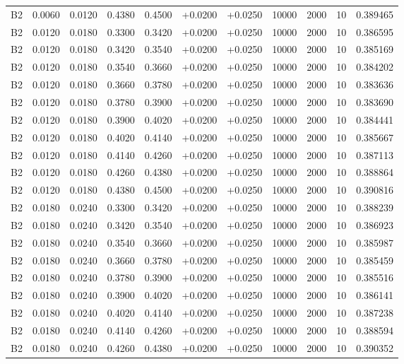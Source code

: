 \documentclass{article}
\begin{document}
\begin{longtable}{l r r r r r r r r r l}
B2 & 0.0060 & 0.0120 & 0.4380 & 0.4500 & +0.0200 & +0.0250 & 10000 & 2000 & 10 & 0.389465 \\
B2 & 0.0120 & 0.0180 & 0.3300 & 0.3420 & +0.0200 & +0.0250 & 10000 & 2000 & 10 & 0.386595 \\
B2 & 0.0120 & 0.0180 & 0.3420 & 0.3540 & +0.0200 & +0.0250 & 10000 & 2000 & 10 & 0.385169 \\
B2 & 0.0120 & 0.0180 & 0.3540 & 0.3660 & +0.0200 & +0.0250 & 10000 & 2000 & 10 & 0.384202 \\
B2 & 0.0120 & 0.0180 & 0.3660 & 0.3780 & +0.0200 & +0.0250 & 10000 & 2000 & 10 & 0.383636 \\
B2 & 0.0120 & 0.0180 & 0.3780 & 0.3900 & +0.0200 & +0.0250 & 10000 & 2000 & 10 & 0.383690 \\
B2 & 0.0120 & 0.0180 & 0.3900 & 0.4020 & +0.0200 & +0.0250 & 10000 & 2000 & 10 & 0.384441 \\
B2 & 0.0120 & 0.0180 & 0.4020 & 0.4140 & +0.0200 & +0.0250 & 10000 & 2000 & 10 & 0.385667 \\
B2 & 0.0120 & 0.0180 & 0.4140 & 0.4260 & +0.0200 & +0.0250 & 10000 & 2000 & 10 & 0.387113 \\
B2 & 0.0120 & 0.0180 & 0.4260 & 0.4380 & +0.0200 & +0.0250 & 10000 & 2000 & 10 & 0.388864 \\
B2 & 0.0120 & 0.0180 & 0.4380 & 0.4500 & +0.0200 & +0.0250 & 10000 & 2000 & 10 & 0.390816 \\
B2 & 0.0180 & 0.0240 & 0.3300 & 0.3420 & +0.0200 & +0.0250 & 10000 & 2000 & 10 & 0.388239 \\
B2 & 0.0180 & 0.0240 & 0.3420 & 0.3540 & +0.0200 & +0.0250 & 10000 & 2000 & 10 & 0.386923 \\
B2 & 0.0180 & 0.0240 & 0.3540 & 0.3660 & +0.0200 & +0.0250 & 10000 & 2000 & 10 & 0.385987 \\
B2 & 0.0180 & 0.0240 & 0.3660 & 0.3780 & +0.0200 & +0.0250 & 10000 & 2000 & 10 & 0.385459 \\
B2 & 0.0180 & 0.0240 & 0.3780 & 0.3900 & +0.0200 & +0.0250 & 10000 & 2000 & 10 & 0.385516 \\
B2 & 0.0180 & 0.0240 & 0.3900 & 0.4020 & +0.0200 & +0.0250 & 10000 & 2000 & 10 & 0.386141 \\
B2 & 0.0180 & 0.0240 & 0.4020 & 0.4140 & +0.0200 & +0.0250 & 10000 & 2000 & 10 & 0.387238 \\
B2 & 0.0180 & 0.0240 & 0.4140 & 0.4260 & +0.0200 & +0.0250 & 10000 & 2000 & 10 & 0.388594 \\
B2 & 0.0180 & 0.0240 & 0.4260 & 0.4380 & +0.0200 & +0.0250 & 10000 & 2000 & 10 & 0.390352 \\

\end{longtable}
\end{document}
